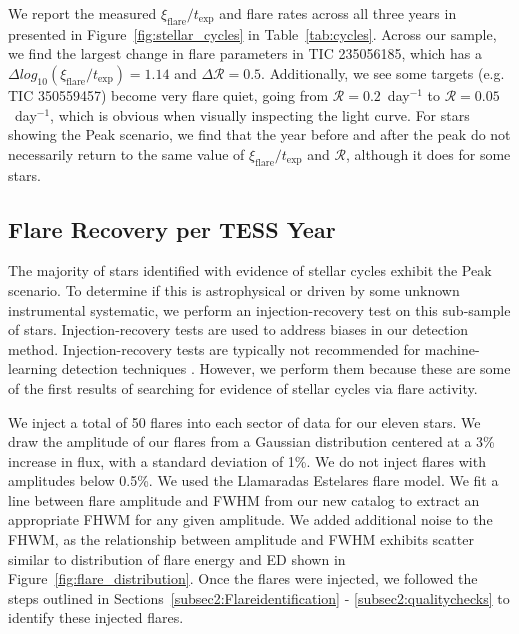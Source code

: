 \documentclass[twocolumn]{aastex631}
\begin{document}
We report the measured $\xi_\textrm{flare}/t_\textrm{exp}$ and flare rates across
all three years in presented in Figure~\ref{fig:stellar_cycles} in Table~\ref{tab:cycles}.
Across our sample, we find the largest change in flare parameters in TIC 235056185,
which has a $\Delta log_{10}(\xi_\textrm{flare} / t_\textrm{exp}) = 1.14$ and
$\Delta \mathcal{R} = 0.5$. Additionally, we see some targets (e.g. TIC 350559457)
become very flare quiet, going from $\mathcal{R} = 0.2$~day$^{-1}$ to $\mathcal{R} = 0.05$~day$^{-1}$,
which is obvious when visually inspecting the light curve. For stars showing the
Peak scenario, we find that the year before and after the peak do not necessarily
return to the same value of $\xi_\textrm{flare} / t_\textrm{exp}$ and $\mathcal{R}$,
although it does for some stars.


\subsection{Flare Recovery per TESS Year}\label{subsec:inj-rec}

The majority of stars identified with evidence of stellar cycles exhibit the Peak
scenario. To determine if this is astrophysical or driven by some unknown instrumental
systematic, we perform an injection-recovery test on this sub-sample of stars.
Injection-recovery tests are used to address biases in our detection method.
Injection-recovery tests are typically not recommended for machine-learning
detection techniques \citep{feinstein20}. However, we perform them because these
are some of the first results of searching for evidence of stellar cycles via
flare activity.

We inject a total of 50 flares into each sector of data for our eleven stars.
We draw the amplitude of our flares from a Gaussian distribution centered at a
3\% increase in flux, with a standard deviation of 1\%. We do not inject flares
with amplitudes below 0.5\%. We used the Llamaradas Estelares flare model. We
fit a line between flare amplitude and FWHM from our new catalog to extract an
appropriate FHWM for any given amplitude. We added additional noise to the FHWM,
as the relationship between amplitude and FWHM exhibits scatter similar to
distribution of flare energy and ED shown in Figure~\ref{fig:flare_distribution}.
Once the flares were injected, we followed the steps outlined in
Sections~\ref{subsec2:Flareidentification} - \ref{subsec2:qualitychecks}
to identify these injected flares.
\end{document}
